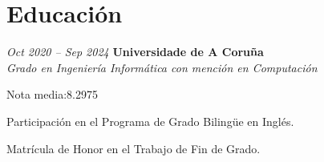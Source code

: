 \section{Educación}

\begin{twocolentry}{
    \textit{Oct 2020 – Sep 2024}}
    \textbf{Universidade de A Coruña} \\
    \textit{Grado en Ingeniería Informática con mención en Computación}
\end{twocolentry}

\vspace{0.10 cm}
\begin{onecolentry}
    \begin{highlights}
        \item Nota media:\@ 8.2975
        \item Participación en el Programa de Grado Bilingüe en Inglés.
        \item Matrícula de Honor en el Trabajo de Fin de Grado.
    \end{highlights}
\end{onecolentry}